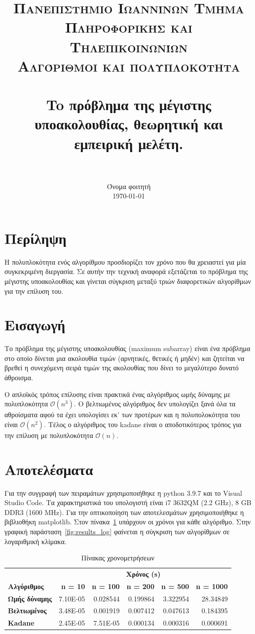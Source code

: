 \documentclass[paper=a4, fontsize=11pt]{scrartcl}
\title{
		\usefont{OT1}{bch}{b}{n}
		\normalfont \normalsize \textsc{Πανεπιστήμιο Ιωαννίνων Τμήμα Πληροφορικής και Τηλεπικοινωνίων} \\ [1em]
		\normalfont \normalsize \textsc{Αλγόριθμοι και πολυπλοκότητα} \\ [1em]
		\horrule{0.5pt} \\[0.4cm]
		\huge To πρόβλημα της μέγιστης υποακολουθίας, θεωρητική και εμπειρική μελέτη. \\
		\horrule{2pt} \\[0.5cm]
}
\author{
		\normalfont 								\normalsize
        Όνομα φοιτητή\\[-1pt]		\normalsize
        \today
}
\date{}
\numberwithin{equation}{section}		%
\numberwithin{figure}{section}			%
\numberwithin{table}{section}				%
\begin{document}
\maketitle

\section*{Περίληψη}
	Η πολυπλοκότητα ενός αλγορίθμου προσδιορίζει τον χρόνο που θα χρειαστεί για μία συγκεκριμένη διεργασία. Σε αυτήν την τεχνική αναφορά εξετάζεται το πρόβλημα της μέγιστης υποακολουθίας και γίνεται σύγκριση μεταξύ τριών διαφορετικών αλγορίθμων για την επίλυση του.
	
\section{Εισαγωγή}
    Το πρόβλημα της μέγιστης υποακολουθίας (maximum subarray) είναι ένα πρόβλημα στο
    οποίο δίνεται μια ακολουθία τιμών (αρνητικές, θετικές ή μηδέν) και ζητείται να βρεθεί η συνεχόμενη σειρά τιμών της ακολουθίας που δίνει το μεγαλύτερο δυνατό άθροισμα. 
    
    Ο απλοϊκός τρόπος επίλυσης είναι πρακτικά ένας αλγόριθμος ωμής δύναμης με πολυπλοκότητα $\mathcal{O}(n^{3})$. Ο βελτιωμένος αλγόριθμος δεν υπολογίζει ξανά όλα τα αθροίσματα αφού τα έχει υπολογίσει εκ' των προτέρων και η πολυπολοκότητα του είναι $\mathcal{O}(n^{2})$. Τέλος ο αλγόριθμος του kadane είναι ο αποδοτικότερος τρόπος για την επίλυση με πολυπλοκότητα $\mathcal{O}(n)$.
    
\section{Αποτελέσματα}
Για την συγγραφή των πειραμάτων χρησιμοποιήθηκε η python 3.9.7 και το Visual Studio Code. Τα χαρακτηριστικά του υπολογιστή είναι i7 3632QM (2.2 GHz), 8 GB DDR3 (1600 MHz). Για την οπτικοποίηση των αποτελεσμάτων χρησιμοποιήθηκε η βιβλιοθήκη matplotlib. Στον πίνακα~\ref{tab:benchmarks} υπάρχουν οι χρόνοι για κάθε αλγόριθμο. Στην γραφική παράσταση~\ref{fig:results_log} φαίνεται η σύγκριση των αλγορίθμων σε λογαριθμική κλίμακα.

\begin{table}[htbp]
  \centering
  \caption{Πίνακας χρονομετρήσεων}
    \begin{tabular}{lrrrrr}
          & \multicolumn{5}{c}{\textbf{Χρόνος (s)}} \\
    \textbf{Αλγόριθμος} & \textbf{n =  10} & \textbf{n =  100} & \textbf{n =  200} & \textbf{n =  500} & \textbf{n =  1000} \\
    \textbf{Ωμής δύναμης} & 7.10E-05 & 0.028544 & 0.199864 & 3.322954 & 28.34849 \\
    \textbf{Βελτιωμένος} & 3.48E-05 & 0.001919 & 0.007412 & 0.047613 & 0.184395 \\
    \textbf{Kadane} & 2.45E-05 & 7.51E-05 & 0.000134 & 0.000316 & 0.000691 \\
    \end{tabular}%
  \label{tab:benchmarks}%
\end{table}%
\end{document}
